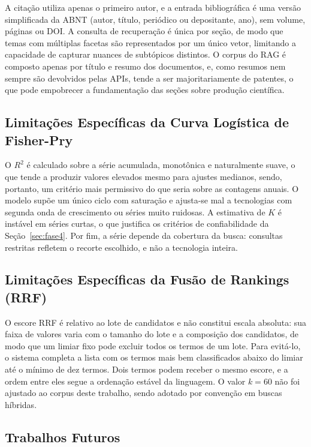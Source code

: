 \documentclass[12pt, a4paper]{article}
\begin{document}
  A citação utiliza apenas o primeiro autor, e a entrada bibliográfica é uma versão simplificada da ABNT (autor, título, periódico ou depositante, ano), sem volume, páginas ou DOI. A consulta de recuperação é única por seção, de modo que temas com múltiplas facetas são representados por um único vetor, limitando a capacidade de capturar nuances de subtópicos distintos. O corpus do RAG é composto apenas por título e resumo dos documentos, e, como resumos nem sempre são devolvidos pelas APIs, tende a ser majoritariamente de patentes, o que pode empobrecer a fundamentação das seções sobre produção científica.

  \subsection{Limitações Específicas da Curva Logística de Fisher-Pry}

  O $R^2$ é calculado sobre a série acumulada, monotônica e naturalmente suave, o que tende a produzir valores elevados mesmo para ajustes medianos, sendo, portanto, um critério mais permissivo do que seria sobre as contagens anuais. O modelo supõe um único ciclo com saturação e ajusta-se mal a tecnologias com segunda onda de crescimento ou séries muito ruidosas. A estimativa de $K$ é instável em séries curtas, o que justifica os critérios de confiabilidade da Seção~\ref{sec:fase4}. Por fim, a série depende da cobertura da busca: consultas restritas refletem o recorte escolhido, e não a tecnologia inteira.

  \subsection{Limitações Específicas da Fusão de Rankings (RRF)}

  O escore RRF é relativo ao lote de candidatos e não constitui escala absoluta: sua faixa de valores varia com o tamanho do lote e a composição dos candidatos, de modo que um limiar fixo pode excluir todos os termos de um lote. Para evitá-lo, o sistema completa a lista com os termos mais bem classificados abaixo do limiar até o mínimo de dez termos. Dois termos podem receber o mesmo escore, e a ordem entre eles segue a ordenação estável da linguagem. O valor $k = 60$ não foi ajustado ao corpus deste trabalho, sendo adotado por convenção em buscas híbridas.

  \subsection{Trabalhos Futuros}
\end{document}
